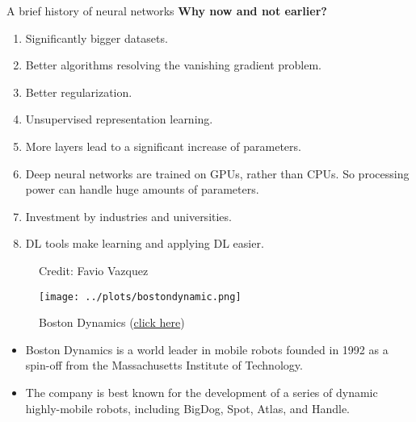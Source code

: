 \begin{vbframe}{A brief history of neural networks}
\textbf{Why now and not earlier?}
\begin{enumerate}
\vspace{2mm}
\item Significantly bigger datasets.
\vspace{2mm}
\item Better algorithms resolving the vanishing gradient problem.
\vspace{2mm}
\item Better regularization.
\vspace{2mm}
\item Unsupervised representation learning.
\vspace{2mm}
\item More layers lead to a significant increase of parameters.
\vspace{2mm}
\item Deep neural networks are trained on GPUs, rather than CPUs. So processing power can handle huge amounts of parameters.
\vspace{2mm}
\item Investment by industries and universities.
\vspace{2mm}
\item DL tools make learning and applying DL easier.
\end{enumerate}
\framebreak

\begin{figure}
\centering
{}
\tiny{Credit: Favio Vazquez}
\framebreak

\end{figure}
\framebreak

\begin{figure}
\centering
\texttt{[image: ../plots/bostondynamic.png]}
\caption{Boston Dynamics (\href{https://www.youtube.com/watch?v=fUyU3lKzoio&ab_channel=BostonDynamics}{click here})}
\end{figure}
\footnotesize
\begin{itemize}
\item Boston Dynamics is a world leader in mobile robots founded in 1992 as a spin-off from the Massachusetts Institute of Technology.
\vspace{.1cm}
\item The company is best known for the development of a series of dynamic highly-mobile robots, including BigDog, Spot, Atlas, and Handle.
\end{itemize}
\framebreak


\end{vbframe}
